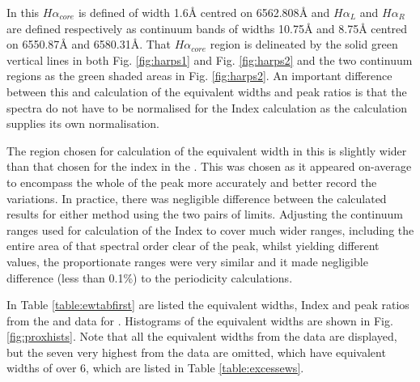 In this $ H\alpha_{core} $ is defined  of width 1.6{\AA} centred on 6562.808{\AA} and $ H\alpha_L $ and
$H \alpha_R $ are defined respectively as continuum bands of widths 10.75{\AA} and 8.75{\AA} centred on 6550.87{\AA} and
6580.31\AA. That $ H\alpha_{core} $ region is delineated by the solid green vertical lines in both Fig. \ref{fig:harps1}
and Fig. \ref{fig:harps2} and the two continuum regions as the green shaded areas in Fig. \ref{fig:harps2}.
An important difference between this and calculation of the equivalent widths and peak ratios is that the
spectra do not have to be normalised for the {\ha} Index calculation as the calculation supplies its own normalisation.

The region chosen for calculation of the {\ha} equivalent width in this {\paperorthesis} is slightly wider than that
chosen for the {\ha} index in the \citet{suarezmascareno15}. This was chosen as it appeared on-average to encompass the
whole of the {\ha} peak more accurately and  better record the variations. In practice, there was
negligible difference between the calculated results for either method using the two pairs of limits. Adjusting the
continuum ranges used for calculation of the {\ha} Index to cover much wider ranges, including the entire area of that
spectral order clear of the {\ha} peak, whilst yielding different values, the proportionate ranges were very similar and
it made negligible difference (less than 0.1\%) to the periodicity calculations.

In Table \ref{table:ewtabfirst} are listed the equivalent widths, {\ha} Index and peak ratios from the {\uves} and
{\harps} data for {\prox}. Histograms of the equivalent widths are shown in Fig. \ref{fig:proxhists}. Note
that all the equivalent widths from the {\uves} data are displayed, but the seven very highest from the {\harps} data are
omitted, which have equivalent widths of over 6, which are listed in Table \ref{table:excessews}. 

